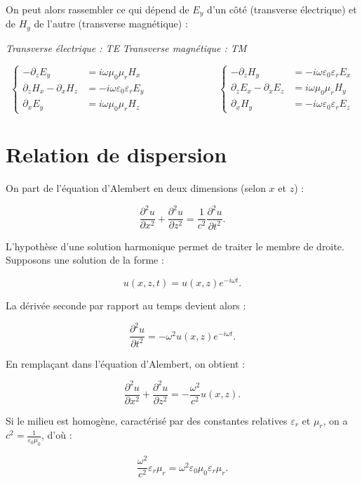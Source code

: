 \documentclass{article}
\begin{document}
On peut alors rassembler ce qui dépend de \(E_y\) d'un côté (transverse électrique) et de \(H_y\) de l'autre (transverse magnétique) : 

\noindent\textit{Transverse électrique : TE} \hfill \textit{Transverse magnétique : TM}

\[
\left\{
\begin{aligned}
-\partial_z E_y &= i\omega \mu_0 \mu_r H_x \\
\partial_z H_x - \partial_x H_z &= -i\omega \varepsilon_0 \varepsilon_r E_y \\
\partial_x E_y &= i\omega \mu_0 \mu_r H_z
\end{aligned}
\right.
\hspace{3cm}
\left\{
\begin{aligned}
-\partial_z H_y &= -i\omega \varepsilon_0 \varepsilon_r E_x \\
\partial_z E_x - \partial_x E_z &= i\omega \mu_0 \mu_r H_y \\
\partial_x H_y &= -i\omega \varepsilon_0 \varepsilon_r E_z
\end{aligned}
\right.
\]

\section*{Relation de dispersion}

On part de l'équation d’Alembert en deux dimensions (selon \(x\) et \(z\)) :

\[
\frac{\partial^2 u}{\partial x^2} + \frac{\partial^2 u}{\partial z^2} = \frac{1}{c^2} \frac{\partial^2 u}{\partial t^2}.
\]

L'hypothèse d'une solution harmonique permet de traiter le membre de droite. Supposons une solution de la forme :

\[
u(x, z, t) = u(x, z)  e^{-i \omega t}.
\]

La dérivée seconde par rapport au temps devient alors :

\[
\frac{\partial^2 u}{\partial t^2} = -\omega^2 u(x, z)  e^{-i \omega t}.
\]

En remplaçant dans l’équation d’Alembert, on obtient :

\[
\frac{\partial^2 u}{\partial x^2} + \frac{\partial^2 u}{\partial z^2} = -\frac{\omega^2}{c^2} u(x, z).
\]

Si le milieu est homogène, caractérisé par des constantes relatives \( \varepsilon_r \) et \( \mu_r \), on a \( c^2 = \frac{1}{\varepsilon_0 \mu_0} \), d’où :

\[
\frac{\omega^2}{c^2} \varepsilon_r \mu_r = \omega^2 \varepsilon_0 \mu_0 \varepsilon_r \mu_r.
\]
\end{document}
